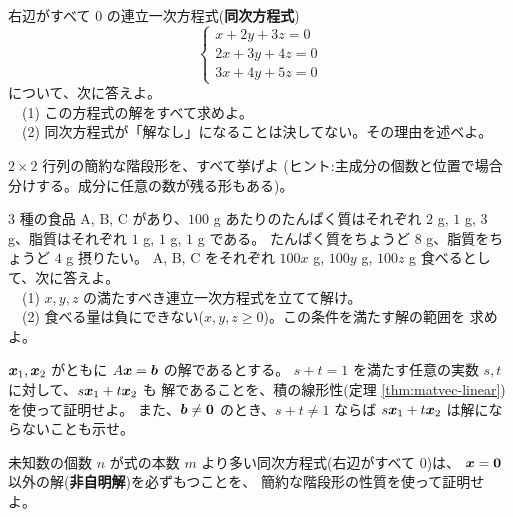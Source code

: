 \begin{mondai}[標準]\label{q:gauss-ex8}
右辺がすべて $0$ の連立一次方程式(\textbf{同次方程式})
\[
\begin{cases}
x + 2y + 3z = 0 \\
2x + 3y + 4z = 0 \\
3x + 4y + 5z = 0
\end{cases}
\]
について、次に答えよ。\\
　(1) この方程式の解をすべて求めよ。\\
　(2) 同次方程式が「解なし」になることは決してない。その理由を述べよ。
\end{mondai}

\begin{mondai}[発展]\label{q:gauss-ex9}
$2 \times 2$ 行列の簡約な階段形を、すべて挙げよ
(ヒント:主成分の個数と位置で場合分けする。成分に任意の数が残る形もある)。
\end{mondai}

\begin{mondai}[発展]\label{q:gauss-ex10}
$3$ 種の食品 A, B, C があり、$100$ g あたりのたんぱく質はそれぞれ
$2$ g, $1$ g, $3$ g、脂質はそれぞれ $1$ g, $1$ g, $1$ g である。
たんぱく質をちょうど $8$ g、脂質をちょうど $4$ g 摂りたい。
A, B, C をそれぞれ $100x$ g, $100y$ g, $100z$ g 食べるとして、次に答えよ。\\
　(1) $x, y, z$ の満たすべき連立一次方程式を立てて解け。\\
　(2) 食べる量は負にできない($x, y, z \ge 0$)。この条件を満たす解の範囲を
求めよ。
\end{mondai}

\begin{mondai}[証明]\label{q:gauss-ex11}
$\bm{x}_1, \bm{x}_2$ がともに $A\bm{x} = \bm{b}$ の解であるとする。
$s + t = 1$ を満たす任意の実数 $s, t$ に対して、$s\bm{x}_1 + t\bm{x}_2$ も
解であることを、積の線形性(定理 \ref{thm:matvec-linear})を使って証明せよ。
また、$\bm{b} \neq \bm{0}$ のとき、$s + t \neq 1$ ならば
$s\bm{x}_1 + t\bm{x}_2$ は解にならないことも示せ。
\end{mondai}

\begin{mondai}[証明]\label{q:gauss-ex12}
未知数の個数 $n$ が式の本数 $m$ より多い同次方程式(右辺がすべて $0$)は、
$\bm{x} = \bm{0}$ 以外の解(\textbf{非自明解})を必ずもつことを、
簡約な階段形の性質を使って証明せよ。
\end{mondai}

